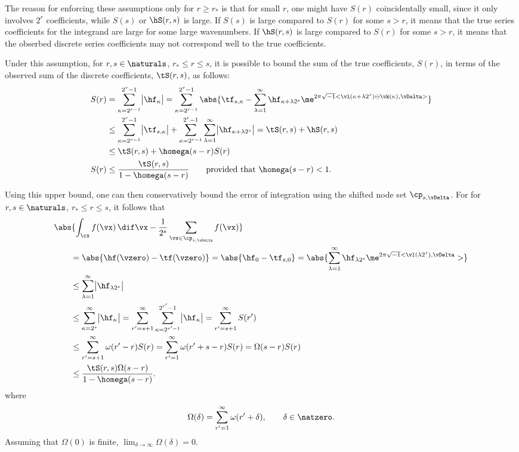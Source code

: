 \documentclass[]{elsarticle}
\theoremstyle{definition}
\theoremstyle{remark}
\begin{document}
The reason for enforcing these assumptions only  for $r \ge r_*$ is that for small $r$, one might have $S(r)$ coincidentally small, since it only involves $2^r$ coefficients, while $S(s)$ or $\hS(r,s)$ is large.  If $S(s)$ is large compared to $S(r)$ for some $s > r$, it means that the true series coefficients for the integrand are large for some large wavenumbers.  If $\hS(r,s)$ is large compared to $S(r)$ for some $s > r$, it means that the obserbed discrete series coefficients may not correspond well to the true coefficients.

Under this assumption, for $r, s \in \naturals$, $r_* \le r \le s$, it is possible to bound the sum of the true coefficients, $S(r)$, in terms of the observed sum of the discrete coefficients, $\tS(r,s)$, as follows:
\begin{align*}
S(r) &= \sum_{\kappa=2^{r-1}}^{2^{r}-1} \bigl \lvert \hf_{\kappa}\bigr\rvert= \sum_{\kappa=2^{r-1}}^{2^{r}-1} \abs{\tf_{s,\kappa} - \sum_{\lambda=1}^{\infty} \hf_{\kappa+\lambda 2^{s}} \me^{2 \pi \sqrt{-1} <\vl(\kappa+\lambda 2^{s}) \ominus \vk(\kappa) , \vDelta>}}\\
&\le \sum_{\kappa=2^{r-1}}^{2^{r}-1} \bigl \lvert \tf_{s,\kappa} \bigr\rvert + \sum_{\kappa=2^{r-1}}^{2^{r}-1} \sum_{\lambda=1}^{\infty} \bigl \lvert \hf_{\kappa+\lambda 2^{s}}\bigr\rvert = \tS(r,s) + \hS(r,s) \\
&\le \tS(r,s) + \homega(s-r) S(r) \\
S(r) & \le \frac{\tS(r,s)}{1 - \homega(s-r)} \qquad \text{provided that } \homega(s-r) < 1.
\end{align*}

Using this upper bound, one can then conservatively bound the error of integration using the shifted node set $\cp_{s,\vDelta}$.  For for $r, s \in \naturals$, $r_* \le r \le s$, it follows that
\begin{align*}
\MoveEqLeft{\abs{\int_{\cx} f(\vx) \, \dif \vx - \frac{1}{2^s} \sum_{\vx \in \cp_{s,\vDelta}} f(\vx) }}\\
&= \abs{\hf(\vzero) - \tf(\vzero)} = \abs{\hf_0 - \tf_{s,0}} = \abs{\sum_{\lambda=1}^{\infty} \hf_{\lambda 2^{s}} \me^{2 \pi \sqrt{-1} <\vl(\lambda 2^{s}), \vDelta}>}\\
&\le \sum_{\lambda=1}^{\infty} \bigl \lvert \hf_{\lambda 2^{s}} \bigr \rvert \\
&\le \sum_{\kappa=2^{s}}^{\infty} \bigl \lvert \hf_{\kappa} \bigr \rvert = \sum_{r'=s+1}^{\infty} \sum_{\kappa=2^{r'-1}}^{2^{r'}-1} \bigl \lvert \hf_{\kappa} \bigr \rvert = \sum_{r'=s+1}^{\infty} S(r')\\
&\le \sum_{r'=s+1}^{\infty} \omega(r'-r) S(r) =   \sum_{r'=1}^{\infty} \omega(r'+s-r) S(r) =  \Omega(s-r) S(r)\\
& \le \frac{\tS(r,s)\Omega(s-r)}{1 - \homega(s-r)}.
\end{align*}
where
\[
\Omega(\delta)=\sum_{r'=1}^{\infty} \omega(r'+ \delta), \qquad \delta \in \natzero.
\]
Assuming that $\Omega(0)$ is finite, $\lim_{\delta \to \infty} \Omega(\delta) = 0$.
\end{document}
